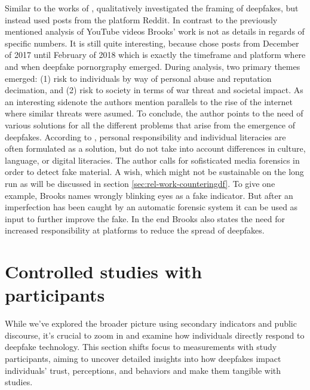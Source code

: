 \documentclass[
  a4paper,  %
  twoside,  %
  bibliography=totoc,
  headsepline,
  cleardoublepage=empty,
  parskip=half,
  draft=false
]{scrbook}
\begin{document}
Similar to the works of \citeauthor{leeBelieveNotBelieve2021}, \citeauthor{brooksPopularDiscourseDeepfakes2021} qualitatively investigated the framing of deepfakes, but instead used posts from the platform Reddit. In contrast to the previously mentioned analysis of YouTube videos Brooks' work is not as details in regards of specific numbers. It is still quite interesting, because \citeauthor{brooksPopularDiscourseDeepfakes2021} chose posts from December of 2017 until February of 2018 which is exactly the timeframe and platform where and when deepfake pornorgraphy emerged. During analysis, two primary themes emerged: (1) risk to individuals by way of personal abuse and reputation decimation, and (2) risk to society in terms of war threat and societal impact. As an interesting sidenote the authors mention parallels to the rise of the internet where similar threats were asumed. To conclude, the author points to the need of various solutions for all the different problems that arise from the emergence of deepfakes. According to \cite{brooksPopularDiscourseDeepfakes2021}, personal responsibility and individual literacies are often formulated as a solution, but do not take into account differences in culture, language, or digital literacies. The author calls for sofisticated media forensics in order to detect fake material. A wish, which might not be sustainable on the long run as will be discussed in section \ref{sec:rel-work-counteringdf}. To give one example, Brooks names wrongly blinking eyes as a fake indicator. But after an imperfection has been caught by an automatic forensic system it can be used as input to further improve the fake. In the end Brooks also states the need for increased responsibility at platforms to reduce the spread of deepfakes.

\section{Controlled studies with participants}
\label{sec:rel-studypart}

While we've explored the broader picture using secondary indicators and public discourse, it's crucial to zoom in and examine how individuals directly respond to deepfake technology. This section shifts focus to measurements with study participants, aiming to uncover detailed insights into how deepfakes impact individuals' trust, perceptions, and behaviors and make them tangible with studies.
\end{document}
